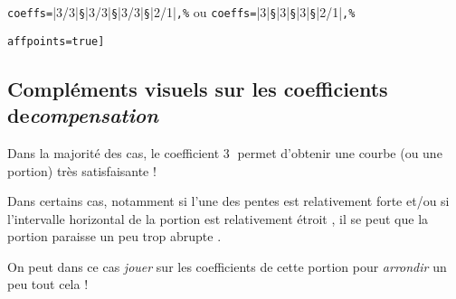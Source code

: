 \documentclass{article}
\begin{document}
\hspace{4cm}\verb|coeffs=|\averb|3/3|\verb|§|\averb|3/3|\verb|§|\averb|3/3|\verb|§|\averb|2/1|\verb|,%| ou \verb|coeffs=|\averb|3|\verb|§|\averb|3|\verb|§|\averb|3|\verb|§|\averb|2/1|\verb|,%|

\hspace{4cm}\verb|affpoints=true|\verb|]|

\newpage

\subsection{Compléments visuels sur les coefficients de\textit{compensation}}

Dans la majorité des cas, le coefficient \textcircled{3} permet d'obtenir une courbe (ou une portion) très satisfaisante !

Dans certains cas, notamment si l'une des pentes est relativement \og forte \fg{} et/ou si l'intervalle horizontal de la portion est relativement \og étroit \fg, il se peut que la portion paraisse un peu trop \og abrupte \fg{}.

On peut dans ce cas \textit{jouer} sur les coefficients de cette portion pour \textit{arrondir} un peu tout cela !
\end{document}

